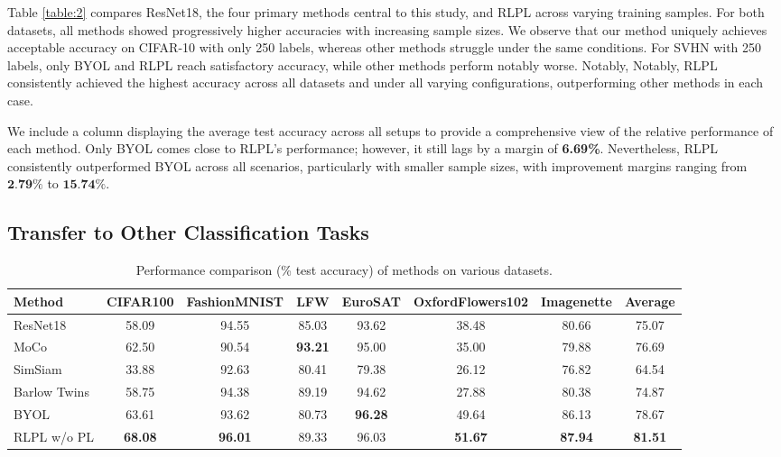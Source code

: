 Table \ref{table:2} compares ResNet18, the four primary methods central to this study, and RLPL across varying training samples. For both datasets, all methods showed progressively higher accuracies with increasing sample sizes. We observe that our method uniquely achieves acceptable accuracy on CIFAR-10 with only 250 labels, whereas other methods struggle under the same conditions. For SVHN with 250 labels, only BYOL and RLPL reach satisfactory accuracy, while other methods perform notably worse. Notably, Notably, RLPL consistently achieved the highest accuracy across all datasets and under all varying configurations, outperforming other methods in each case.

We include a column displaying the average test accuracy across all setups to provide a comprehensive view of the relative performance of each method. Only BYOL comes close to RLPL's performance; however, it still lags by a margin of \textbf{6.69\%}. Nevertheless, RLPL consistently outperformed BYOL across all scenarios, particularly with smaller sample sizes, with improvement margins ranging from $\textbf{2.79\%}$ to $\textbf{15.74\%}$.

\subsection{Transfer to Other Classification Tasks}

\begin{table}[htbp]
  \centering
  \begin{tabular}{lccccccc}
  \hline
  \textbf{Method} & \textbf{CIFAR100} & \textbf{FashionMNIST} & \textbf{LFW} & \textbf{EuroSAT} & \textbf{OxfordFlowers102} & \textbf{Imagenette} & Average \\ \hline
  ResNet18 & 58.09 & 94.55 & 85.03 & 93.62 & 38.48 & 80.66 & 75.07 \\
  MoCo & 62.50 & 90.54 & \bf 93.21 & 95.00 & 35.00 & 79.88 & 76.69 \\
  SimSiam & 33.88 & 92.63 & 80.41 & 79.38 & 26.12 & 76.82 & 64.54 \\
  Barlow Twins & 58.75 & 94.38 & 89.19 & 94.62 & 27.88 & 80.38 & 74.87 \\
  BYOL & 63.61 & 93.62 & 80.73 & \bf 96.28 & 49.64 & 86.13 & 78.67 \\
  RLPL w/o PL & \bf 68.08 & \bf 96.01 & 89.33 & 96.03 & \bf 51.67 & \bf 87.94 & \bf 81.51 \\ \hline
  \end{tabular}
  \caption{Performance comparison (\% test accuracy) of methods on various datasets.}
  \label{table:transfer}
\end{table}

